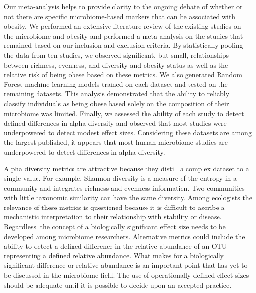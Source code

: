 \documentclass[12pt,]{article}
\begin{document}
Our meta-analysis helps to provide clarity to the ongoing debate of
whether or not there are specific microbiome-based markers that can be
associated with obesity. We performed an extensive literature review of
the existing studies on the microbiome and obesity and performed a
meta-analysis on the studies that remained based on our inclusion and
exclusion criteria. By statistically pooling the data from ten studies,
we observed significant, but small, relationships between richness,
evenness, and diversity and obesity status as well as the relative risk
of being obese based on these metrics. We also generated Random Forest
machine learning models trained on each dataset and tested on the
remaining datasets. This analysis demonstrated that the ability to
reliably classify individuals as being obese based solely on the
composition of their microbiome was limited. Finally, we assessed the
ability of each study to detect defined differences in alpha diversity
and observed that most studies were underpowered to detect modest effect
sizes. Considering these datasets are among the largest published, it
appears that most human microbiome studies are underpowered to detect
differences in alpha diversity.

Alpha diversity metrics are attractive because they distill a complex
dataset to a single value. For example, Shannon diversity is a measure
of the entropy in a community and integrates richness and evenness
information. Two communities with little taxonomic similarity can have
the same diversity. Among ecologists the relevance of these metrics is
questioned because it is difficult to ascribe a mechanistic
interpretation to their relationship with stability or disease.
Regardless, the concept of a biologically significant effect size needs
to be developed among microbiome researchers. Alternative metrics could
include the ability to detect a defined difference in the relative
abundance of an OTU representing a defined relative abundance. What
makes for a biologically significant difference or relative abundance is
an important point that has yet to be discussed in the microbiome field.
The use of operationally defined effect sizes should be adequate until
it is possible to decide upon an accepted practice.
\end{document}
